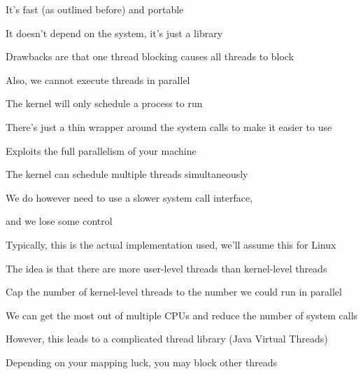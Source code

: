   \begin{slide}


    It's fast (as outlined before) and portable

    \leftspace{}It doesn't depend on the system, it's just a library
    \medskip

    Drawbacks are that one thread blocking causes all threads to block

    \leftspace{}Also, we cannot execute threads in parallel

    \leftspace{}\leftspace{}The kernel will only schedule a process to run

  \end{slide}

  \begin{slide}


    There's just a thin wrapper around the system calls to make it easier to use
    \medskip

    Exploits the full parallelism of your machine

    \leftspace{}The kernel can schedule multiple threads simultaneously
    \medskip

    We do however need to use a slower system call interface,

    \leftspace{}and we lose some control
    \bigskip

    Typically, this is the actual implementation used, we'll assume this for
    Linux

  \end{slide}

  \begin{slide}


    The idea is that there are more user-level threads than kernel-level threads

    \leftspace{}Cap the number of kernel-level threads to the number we could
    run in parallel
    \medskip

    We can get the most out of multiple CPUs and reduce the number of system
    calls
    \medskip

    However, this leads to a complicated thread library (Java Virtual Threads)

    \leftspace{}Depending on your mapping luck, you may block other threads

  \end{slide}

